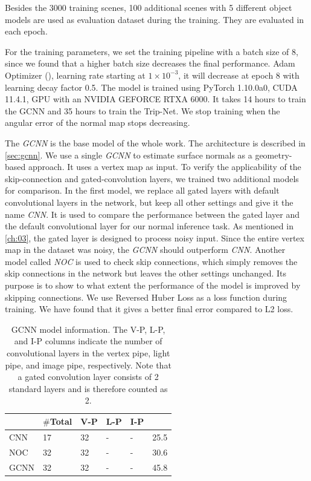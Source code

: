 Besides the 3000 training scenes, 100 additional scenes with 5 different object models are used as evaluation dataset during the training. They are evaluated in each epoch. 

For the training parameters, we set the training pipeline with a batch size of 8, since we found that a higher batch size decreases the final performance.  Adam Optimizer (\cite{adam}), learning rate starting at $ 1\times10^{-3} $, it will decrease at epoch 8 with learning decay factor 0.5. The model is trained using PyTorch 1.10.0a0, CUDA 11.4.1, GPU with an NVIDIA GEFORCE RTXA 6000. It takes 14 hours to train the GCNN and 35 hours to train the Trip-Net. We stop training when the angular error of the normal map stops decreasing.


The \textit{GCNN} is the base model of the whole work. The architecture is described in \ref{sec:gcnn}. We use a single \textit{GCNN} to estimate surface normals as a geometry-based approach. It uses a vertex map as input. To verify the applicability of the skip-connection and gated-convolution layers, we trained two additional models for comparison. 
In the first model, we replace all gated layers with default convolutional layers in the network, but keep all other settings and give it the name \textit{CNN}. It is used to compare the performance between the gated layer and the default convolutional layer for our normal inference task. As mentioned in \ref{ch:03}, the gated layer is designed to process noisy input. Since the entire vertex map in the dataset was noisy, the \textit{GCNN} should outperform \textit{CNN}. 
Another model called \textit{NOC} is used to check skip connections, which simply removes the skip connections in the network but leaves the other settings unchanged. Its purpose is to show to what extent the performance of the model is improved by skipping connections. We use Reversed Huber Loss as a loss function during training. We have found that it gives a better final error compared to L2 loss. 



\begin{table}[H]
	\centering
	\captionsetup{width=\linewidth}
	\begin{tabular}{l | l l l l l }
		\toprule
		\tabhead{Model} & $ \# $\textbf{Total} &\textbf{ V-P} & \textbf{L-P} & \textbf{I-P} & \tabhead{Size /MB}\\
		\midrule
		\hline
		CNN 					& 17 & 32 & - & - & 25.5 \\
		\hline
		NOC 					& 32 & 32 & - & - & 30.6 \\
		\hline
		GCNN 					& 32 & 32 & - & - & 45.8 \\
		\bottomrule
	\end{tabular}
	\caption{GCNN model information. The V-P, L-P, and I-P columns indicate the number of convolutional layers in the vertex pipe, light pipe, and image pipe, respectively. Note that a gated convolution layer consists of 2 standard layers and is therefore counted as 2.}	
	\label{tab:gcnn-eval-mean}
\end{table}


